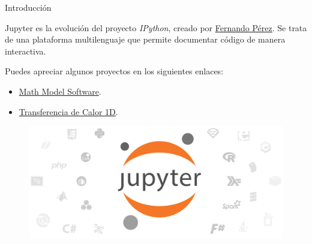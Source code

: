 \begin{frame}[t]{Introducci\'on}\vspace{10pt}

Jupyter es la evoluci\'on del proyecto \textit{IPython}, creado por {\color{blue} \href{https://en.wikipedia.org/wiki/Fernando_P\%C3\%A9rez_(software_developer)}{Fernando P\'erez}}. Se trata de una plataforma multilenguaje que permite documentar código de manera interactiva.

\vspace{5pt}

Puedes apreciar algunos proyectos en los siguientes enlaces:

\begin{itemize}
	\item {\color{blue} \href{https://mybinder.org/v2/gh/jdarguello/MathModel/master?filepath=MathModel.ipynb}{Math Model Software}}.
	\item {\color{blue} \href{https://mybinder.org/v2/gh/jdarguello/FEM/master?filepath=Pr\%C3\%A1cticas\%2FCasa\%2FTransferencia\%20de\%20calor\%201D\%2FTC1D.ipynb}{Transferencia de Calor 1D}}.
\end{itemize}

\begin{figure}
	\includegraphics[scale=0.5]{Images/logo.PNG}
\end{figure}

\end{frame}